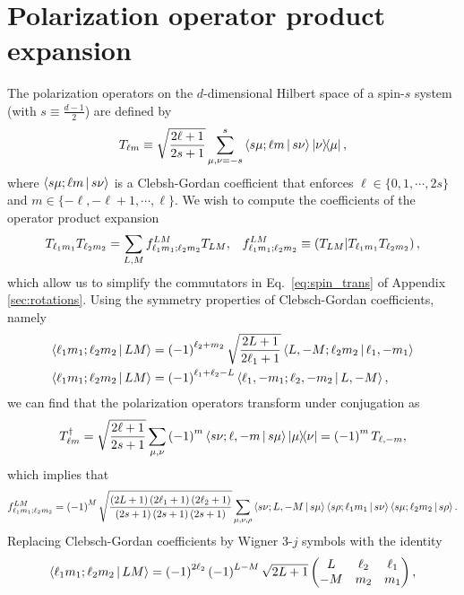 \documentclass[nofootinbib,twocolumn]{revtex4-1}
\newcommand{\f}[2]{\dfrac{#1}{#2}} %
\newcommand{\p}[1]{\left(#1\right)} %
\newcommand{\bk}{\Braket} %
\renewcommand{\set}[1]{\{#1\}} %
\def\obk#1{\mathinner{({#1})}}
\begin{document}
\section{Polarization operator product expansion}
\label{sec:trans_prod}

The polarization operators on the $d$-dimensional Hilbert space of a spin-$s$ system (with $s\equiv\frac{d-1}{2}$) are defined by
\begin{align}
  T_{\ell m} \equiv \sqrt{\f{2\ell+1}{2s+1}} \sum_{\mu,\nu=-s}^s
  \bk{s\mu;\ell m|s\nu} \op{\nu}{\mu},
\end{align}
where $\bk{s\mu;\ell m|s\nu}$ is a Clebsh-Gordan coefficient that enforces $\ell\in\set{0,1,\cdots,2s}$ and $m\in\set{-\ell,-\ell+1,\cdots,\ell}$.
We wish to compute the coefficients of the operator product expansion
\begin{align}
  T_{\ell_1 m_1} T_{\ell_2 m_2}
  = \sum_{L,M} f_{\ell_1 m_1;\ell_2 m_2}^{LM} T_{LM},
  &&
  f_{\ell_1 m_1;\ell_2 m_2}^{LM}
  \equiv \obk{T_{LM} | T_{\ell_1 m_1} T_{\ell_2 m_2}},
\end{align}
which allow us to simplify the commutators in Eq.~\eqref{eq:spin_trans} of Appendix \ref{sec:rotations}.
Using the symmetry properties of Clebsch-Gordan coefficients, namely
\begin{align}
  \bk{\ell_1 m_1; \ell_2 m_2| L M}
  &= \p{-1}^{\ell_2+m_2} \sqrt{\f{2L+1}{2\ell_1+1}}
  \bk{L,-M; \ell_2 m_2| \ell_1,-m_1} \\
  \bk{\ell_1 m_1; \ell_2 m_2| L M}
  &= \p{-1}^{\ell_1+\ell_2-L}
  \bk{\ell_1,-m_1; \ell_2,-m_2| L,-M},
\end{align}
we can find that the polarization operators transform under conjugation as
\begin{align}
  T_{\ell m}^\dag
  = \sqrt{\f{2\ell+1}{2s+1}}
  \sum_{\mu,\nu} \p{-1}^m \bk{s\nu;\ell,-m|s\mu} \op{\mu}{\nu}
  = \p{-1}^m T_{\ell,-m},
\end{align}
which implies that
\begin{align}
  f_{\ell_1 m_1;\ell_2 m_2}^{LM}
  = \p{-1}^M \sqrt{\f{\p{2L+1}\p{2\ell_1+1}\p{2\ell_2+1}}
    {\p{2s+1}\p{2s+1}\p{2s+1}}}
  \sum_{\mu,\nu,\rho} \bk{s\nu;L,-M|s\mu}
  \bk{s\rho;\ell_1m_1|s\nu} \bk{s\mu;\ell_2m_2|s\rho}.
\end{align}
Replacing Clebsch-Gordan coefficients by Wigner 3-$j$ symbols with the identity
\begin{align}
  \bk{\ell_1 m_1; \ell_2 m_2| L M}
  = \p{-1}^{2\ell_2} \p{-1}^{L-M} \sqrt{2L+1}
  \begin{pmatrix}
    L & \ell_2 & \ell_1 \\
    -M & m_2 & m_1
  \end{pmatrix},
\end{align}
\end{document}
